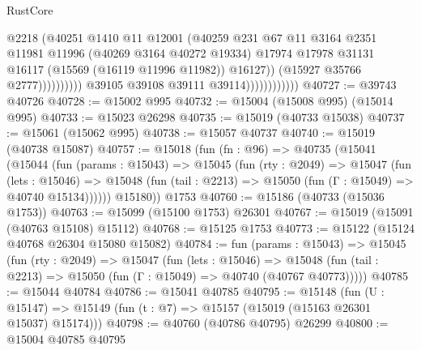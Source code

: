\begin{lexlean}{RustCore}
\begin{coremodule}
                                              @2218
                                              (@40251
                                                @1410
                                                @11
                                                @12001
                                                (@40259
                                                  @231
                                                  @67
                                                  @11
                                                  @3164
                                                  @2351
                                                  @11981
                                                  @11996
                                                  (@40269 @3164 @40272 @19334)
                                                  @17974
                                                  @17978
                                                  @31131
                                                  @16117
                                                  (@15569 (@16119 @11996 @11982))
                                                  @16127))
                                              (@15927 @35766 @2777))))))))))
                            @39105
                            @39108
                            @39111
                            @39114))))))))))))
@40727 := @39743 @40726
@40728 := @15002 @995
@40732 := @15004 (@15008 @995) (@15014 @995)
@40733 := @15023 @26298
@40735 := @15019 (@40733 @15038)
@40737 := @15061 (@15062 @995)
@40738 := @15057 @40737
@40740 := @15019 (@40738 @15087)
@40757 := @15018
    (fun (fn : @96) =>
    @40735
      (@15041
        (@15044
          (fun (params : @15043) =>
          @15045
            (fun (rty : @2049) =>
            @15047
              (fun (lets : @15046) =>
              @15048 (fun (tail : @2213) => @15050 (fun (Γ : @15049) => @40740 @15134))))))
        @15180))
    @1753
@40760 := @15186 (@40733 (@15036 @1753))
@40763 := @15099 (@15100 @1753) @26301
@40767 := @15019 (@15091 (@40763 @15108) @15112)
@40768 := @15125 @1753
@40773 := @15122 (@15124 @40768 @26304 @15080 @15082)
@40784 := fun (params : @15043) =>
  @15045
    (fun (rty : @2049) =>
    @15047
      (fun (lets : @15046) =>
      @15048 (fun (tail : @2213) => @15050 (fun (Γ : @15049) => @40740 (@40767 @40773)))))
@40785 := @15044 @40784
@40786 := @15041 @40785
@40795 := @15148
    (fun (U : @15147) => @15149 (fun (t : @7) => @15157 (@15019 (@15163 @26301 @15037) @15174)))
@40798 := @40760 (@40786 @40795) @26299
@40800 := @15004 @40785 @40795

\end{coremodule}
\end{lexlean}
